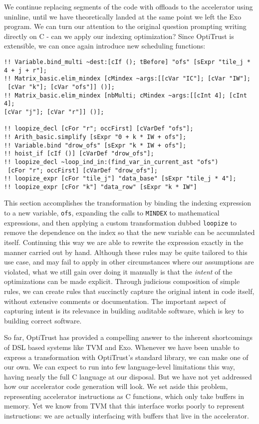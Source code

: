 \documentclass[acmsmall, nonacm=true]{acmart}
\begin{document}
We continue replacing segments of the code with offloads to the accelerator using uninline, until we have theoretically landed at the same point we left the Exo program. We can turn our attention to the original question prompting writing directly on C - can we apply our indexing optimization? Since OptiTrust is extensible, we can once again introduce new scheduling functions:

\begin{verbatim}
!! Variable.bind_multi ~dest:[cIf (); tBefore] "ofs" [sExpr "tile_j * 4 + j + r"];
!! Matrix_basic.elim_mindex [cMindex ~args:[[cVar "IC"]; [cVar "IW"];
 [cVar "k"]; [cVar "ofs"]] ()];
!! Matrix_basic.elim_mindex [nbMulti; cMindex ~args:[[cInt 4]; [cInt 4];
[cVar "j"]; [cVar "r"]] ()];

!! loopize_decl [cFor "r"; occFirst] [cVarDef "ofs"];
!! Arith_basic.simplify [sExpr "0 + k * IW + ofs"];
!! Variable.bind "drow_ofs" [sExpr "k * IW + ofs"];
!! hoist_if [cIf ()] [cVarDef "drow_ofs"];
!! loopize_decl ~loop_ind_in:(find_var_in_current_ast "ofs")
 [cFor "r"; occFirst] [cVarDef "drow_ofs"];
!! loopize_expr [cFor "tile_j"] "data_base" [sExpr "tile_j * 4"];
!! loopize_expr [cFor "k"] "data_row" [sExpr "k * IW"]
\end{verbatim}

This section accomplishes the transformation by binding the indexing expression to a new variable, \verb|ofs|, expanding the calls to \verb|MINDEX| to mathematical expressions, and then applying a custom transformation dubbed \verb|loopize| to remove the dependence on the index so that the new variable can be accumulated itself. Continuing this way we are able to rewrite the expression exactly in the manner carried out by hand. Although these rules may be quite tailored to this use case, and may fail to apply in other circumstances where our assumptions are violated, what we still gain over doing it manually is that the \textit{intent} of the optimizations can be made explicit. Through judicious composition of simple rules, we can create rules that succinctly capture the original intent in code itself, without extensive comments or documentation. The important aspect of capturing intent is its relevance in building auditable software, which is key to building correct software.

So far, OptiTrust has provided a compelling answer to the inherent shortcomings of DSL based systems like TVM and Exo. Whenever we have been unable to express a transformation with OptiTrust's standard library, we can make one of our own. We can expect to run into few language-level limitations this way, having nearly the full C language at our disposal. But we have not yet addressed how our accelerator code generation will look. We set aside this problem, representing accelerator instructions as C functions, which only take buffers in memory. Yet we know from TVM that this interface works poorly to represent instructions: we are actually interfacing with buffers that live in the accelerator. 
\end{document}
